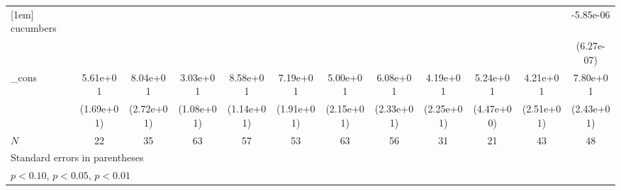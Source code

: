 \begin{table}[htbp]
\begin{tabular}{l*{11}{c}}
[1em]
cucumbers   &                     &                     &                     &                     &                     &                     &                     &                     &                     &                     &   -5.85e-06\sym{***}\\
            &                     &                     &                     &                     &                     &                     &                     &                     &                     &                     &  (6.27e-07)         \\
[1em]
\_cons      &    5.61e+01\sym{**} &    8.04e+01\sym{**} &    3.03e+01\sym{**} &    8.58e+01\sym{***}&    7.19e+01\sym{***}&    5.00e+01\sym{*}  &    6.08e+01\sym{**} &    4.19e+01         &    5.24e+01\sym{***}&    4.21e+01         &    7.80e+01\sym{**} \\
            &  (1.69e+01)         &  (2.72e+01)         &  (1.08e+01)         &  (1.14e+01)         &  (1.91e+01)         &  (2.15e+01)         &  (2.33e+01)         &  (2.25e+01)         &  (4.47e+00)         &  (2.51e+01)         &  (2.43e+01)         \\
\hline
\(N\)       &          22         &          35         &          63         &          57         &          53         &          63         &          56         &          31         &          21         &          43         &          48         \\
\hline\hline
\multicolumn{12}{l}{\footnotesize Standard errors in parentheses}\\
\multicolumn{12}{l}{\footnotesize \sym{*} \(p<0.10\), \sym{**} \(p<0.05\), \sym{***} \(p<0.01\)}\\
\end{tabular}
\end{table}
